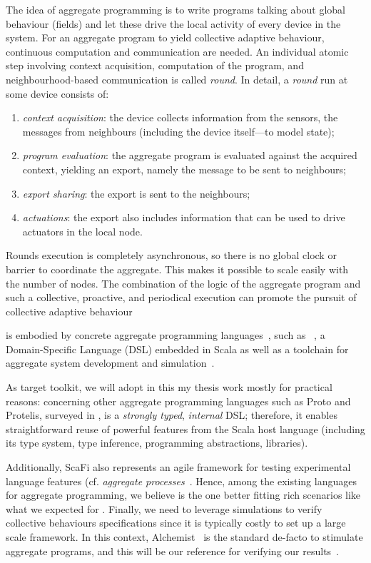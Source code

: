 \documentclass[11pt]{article}
\begin{document}
The idea of aggregate programming is to write programs talking about global behaviour (fields) and let these drive the local activity of every device in the system.
%
For an aggregate program to yield collective adaptive behaviour, continuous computation and communication are needed.
%
An individual atomic step involving context acquisition, computation of the program, and neighbourhood-based communication is called \emph{round}.
%
In detail, a \emph{round} run at some device consists of:
\begin{enumerate}
  \item \emph{context acquisition}: the device collects information from the sensors, the messages from neighbours (including the device itself---to model state);
  \item \emph{program evaluation}: the aggregate program is evaluated against the acquired context, yielding an export, namely the message to be sent to neighbours;
  \item \emph{export sharing}: the export is sent to the neighbours;
  \item \emph{actuations}: the export also includes information that can be used to drive actuators in the local node.
\end{enumerate}

Rounds execution is completely asynchronous, so there is no global clock or barrier to coordinate the aggregate. This makes it possible to scale easily with the number of nodes. 
%
The combination of the logic of the aggregate program and such a collective, proactive, and periodical execution can promote the pursuit of collective adaptive behaviour

\ac{} is embodied by concrete aggregate programming languages~\cite{viroli2019jlamp-si-coord},
 such as \scafi{}~\cite{DBLP:conf/isola/CasadeiVAD20,DBLP:journals/eaai/CasadeiVAPD21},
 a Domain-Specific Language (DSL) embedded in Scala
 as well as a toolchain for aggregate system development and simulation~\cite{Casadei2016mass}.
%

As target toolkit, we will adopt \scafi{} in this my thesis work mostly for practical reasons: concerning other aggregate programming languages such as Proto and Protelis, surveyed in \cite{viroli2019jlamp-si-coord},
\scafi{} is a \emph{strongly typed}, \emph{internal} DSL; therefore, it enables straightforward reuse of powerful features from the Scala host language (including its type system, type inference, programming abstractions, libraries).

Additionally, ScaFi also represents an agile framework for testing experimental language features (cf. \emph{aggregate processes}~\cite{DBLP:journals/eaai/CasadeiVAPD21}.
%
Hence, among the existing languages for aggregate programming, we believe \scafi{} is the one better fitting rich scenarios like what we expected for \cpsw{}.
%
Finally, we need to leverage simulations to verify collective behaviours specifications since it is typically costly to set up a large scale framework. In this context, Alchemist~\cite{} is the standard de-facto to stimulate aggregate programs, and this will be our reference for verifying our results~\cite{Pianini_2013}.
\end{document}
